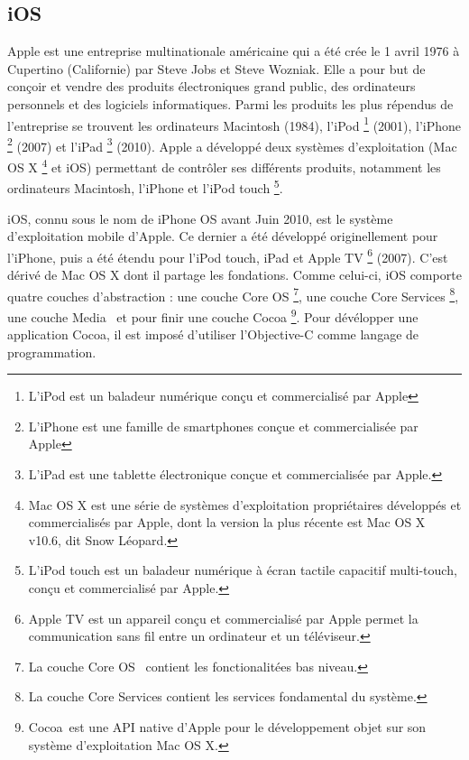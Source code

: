 \subsection{iOS}
	Apple est une entreprise multinationale américaine qui a été crée le 1 avril 1976 à Cupertino (Californie) par Steve Jobs et Steve Wozniak. Elle a pour but de conçoir et vendre des produits électroniques grand public, des ordinateurs personnels et des logiciels informatiques. Parmi les produits les plus répendus de l'entreprise se trouvent les ordinateurs Macintosh (1984), l'iPod \footnote{L'iPod est un baladeur numérique conçu et commercialisé par Apple} (2001), l'iPhone \footnote{L'iPhone est une famille de smartphones conçue et commercialisée par Apple}  (2007) et l'iPad \footnote{L'iPad est une tablette électronique conçue et commercialisée par Apple.} (2010). Apple a développé deux systèmes d'exploitation (Mac OS X \footnote{Mac OS X est une série de systèmes d’exploitation propriétaires développés et commercialisés par Apple, dont la version la plus récente est Mac OS X v10.6, dit Snow Léopard.} et iOS) permettant de contrôler ses différents produits, notamment les ordinateurs Macintosh, l'iPhone et l'iPod touch \footnote{L’iPod touch est un baladeur numérique à écran tactile capacitif multi-touch, conçu et commercialisé par Apple.}.
			
	iOS, connu sous le nom de iPhone OS avant Juin 2010, est le système d'exploitation mobile d'Apple. Ce dernier a été développé originellement pour l'iPhone, puis a été étendu pour l'iPod touch, iPad  et Apple TV \footnote{Apple TV est un appareil conçu et commercialisé par Apple permet la communication sans fil entre un ordinateur et un téléviseur.} (2007). C'est dérivé de Mac OS X  dont il partage les fondations. Comme celui-ci, iOS comporte quatre couches d'abstraction : une couche \og Core OS \fg \footnote{La couche \og Core OS \fg \,  contient les fonctionalitées bas niveau.}, une couche \og Core Services \fg \footnote{La couche \og Core Services \fg contient les services fondamental du système.}, une couche \og Media \fg \, et pour finir une couche \og Cocoa \fg \footnote{\og Cocoa \fg \,est une API native d'Apple pour le développement objet sur son système d'exploitation Mac OS X.}. Pour dévélopper une application Cocoa, il est imposé d'utiliser l'Objective-C comme langage de programmation.
			
